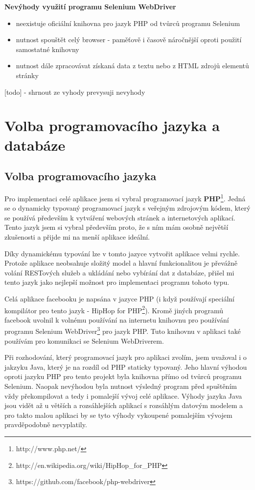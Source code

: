 \documentclass[thesis=M,czech]{FITthesis}[2013/05/10]
\begin{document}
\textbf{Nevýhody využití programu Selenium WebDriver}

\begin{itemize}
  \item neexistuje oficiální knihovna pro jazyk PHP 
  od tvůrců programu Selenium
  \item nutnost spouštět celý browser - paměťově i časově náročnější
  oproti použití samostatné knihovny
  \item nutnost dále zpracovávat získaná data z textu nebo z HTML zdrojů elementů stránky
\end{itemize}

[todo] - shrnout ze vyhody prevysuji nevyhody

\section{Volba programovacího jazyka a databáze}

\subsection{Volba programovacího jazyka}

Pro implementaci celé aplikace jsem si vybral programovací jazyk \textbf{PHP}\footnote{http://www.php.net/}. Jedná se o dynamicky typovaný programovací jazyk s veřejným zdrojovým kódem, který se používá především k vytváření webových stránek a internetových aplikací. Tento jazyk jsem si vybral především proto, že s ním mám osobně největší zkušenosti a přijde mi na menší aplikace ideální. 

Díky dynamickému typování lze v tomto jazyce vytvořit aplikace velmi rychle. Protože aplikace neobsahuje složitý model a hlavní funkcionalitou je převážně volání RESTových služeb a ukládání nebo vybírání dat z databáze, přišel mi tento jazyk jako nejlepší možnost pro implementaci programu tohoto typu.

Celá aplikace facebooku je napsána v jazyce PHP (i když používají speciální kompilátor pro tento jazyk - HipHop for PHP\footnote{http://en.wikipedia.org/wiki/HipHop\_for\_PHP}). Kromě jiných programů facebook uvolnil k volnému používání na internetu knihovnu pro používání programu Selenium WebDriver\footnote{https://github.com/facebook/php-webdriver} pro jazyk PHP. Tuto knihovnu v aplikaci také používám pro komunikaci se Selenium WebDriverem.

Při rozhodování, který programovací jazyk pro aplikaci zvolím, jsem uvažoval i o jakzyku Java, který je na rozdíl od PHP staticky typovaný. Jeho hlavní výhodou oproti jazyku PHP pro tento projekt byla knihovna přímo od tvůrců programu Selenium. Naopak nevýhodou byla nutnost výsledný program před spuštěním vždy překompilovat a tedy i pomalejší vývoj celé aplikace. Výhody jazyka Java jsou vidět až u větších a rozsáhlejších aplikací s rozsáhlým datovým modelem a pro takto malou aplikaci by se tyto výhody vykoupené pomalejším vývojem pravděpodobně nevyplatily. 
\end{document}
